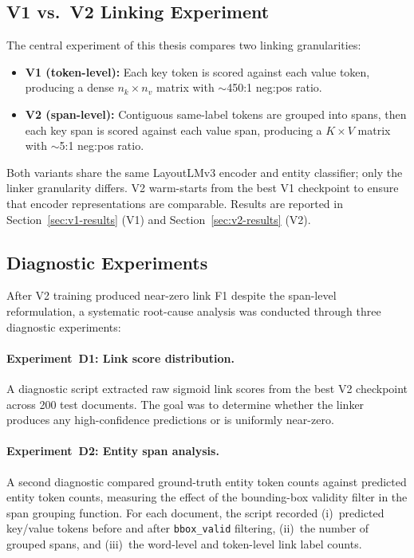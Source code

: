 \subsection{V1 vs.\ V2 Linking Experiment}
\label{sec:v1-v2-experiment}

The central experiment of this thesis compares two linking granularities:

\begin{itemize}
  \item \textbf{V1 (token-level):} Each key token is scored against each
  value token, producing a dense $n_k \times n_v$ matrix with $\sim$450:1
  neg:pos ratio.
  \item \textbf{V2 (span-level):} Contiguous same-label tokens are grouped
  into spans, then each key span is scored against each value span, producing
  a $K \times V$ matrix with $\sim$5:1 neg:pos ratio.
\end{itemize}

Both variants share the same LayoutLMv3 encoder and entity classifier; only
the linker granularity differs. V2 warm-starts from the best V1 checkpoint
to ensure that encoder representations are comparable. Results are reported
in Section~\ref{sec:v1-results} (V1) and Section~\ref{sec:v2-results} (V2).

\subsection{Diagnostic Experiments}
\label{sec:diagnostic-experiments}

After V2 training produced near-zero link F1 despite the span-level
reformulation, a systematic root-cause analysis was conducted through three
diagnostic experiments:

\paragraph{Experiment~D1: Link score distribution.}
A diagnostic script extracted raw sigmoid link scores from the best V2
checkpoint across 200 test documents.  The goal was to determine whether the
linker produces any high-confidence predictions or is uniformly near-zero.

\paragraph{Experiment~D2: Entity span analysis.}
A second diagnostic compared ground-truth entity token counts against
predicted entity token counts, measuring the effect of the bounding-box
validity filter in the span grouping function.  For each document, the script
recorded (i)~predicted key/value tokens before and after \texttt{bbox\_valid}
filtering, (ii)~the number of grouped spans, and (iii)~the word-level and
token-level link label counts.

